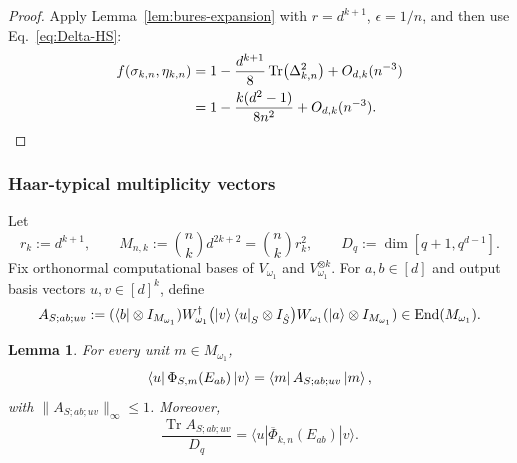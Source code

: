 \documentclass[10pt,twocolumn,superscriptaddress,aps,amsmath,amssymb,citeautoscript,floatfix,prx]{revtex4-2}
\theoremstyle{plain}
\theoremstyle{plain}
\theoremstyle{plain}
\theoremstyle{plain}
\theoremstyle{plain}
\theoremstyle{plain}
\newcommand{\End}{\mathrm{End}}
\theoremstyle{plain}
\newtheorem{smlemma}[smtheorem]{Lemma}
\theoremstyle{definition}
\theoremstyle{plain}
\begin{document}
\begin{appendix}
\begin{proof}
Apply Lemma~\ref{lem:bures-expansion} with $r=d^{k+1}$, $\epsilon=1/n$, and then use Eq.~\eqref{eq:Delta-HS}:
\begin{align*}
  f(\sigma_{k,n},\eta_{k,n})
  &=1-\frac{d^{k+1}}8\Tr(\Delta_{k,n}^2)
       +O_{d,k}(n^{-3})\\
  &=1-\frac{k(d^2-1)}{8n^2}+O_{d,k}(n^{-3}).
\end{align*}
\end{proof}

\subsubsection{Haar-typical multiplicity vectors}\label{subsubsec:supple_haar_typical}

Let
\[
  r_k:=d^{k+1},
  \qquad
  M_{n,k}:=\binom nk d^{2k+2}=\binom nk r_k^2, \qquad D_q:=\operatorname{dim}\left[q+1, q^{d-1}\right].
\]
Fix orthonormal computational bases of $V_{\omega_1}$ and $V_{\omega_1}^{\otimes k}$. 
For $a,b\in[d]$ and output basis vectors $u,v\in[d]^k$, define
\begin{equation}
\label{eq:test-operator}
  A_{S;ab;uv}
  :=(\bra b\otimes I_{M_{\omega_1}})
  W_{\omega_1}^\dagger\bigl(\ket v\bra u_S\otimes I_{\hat S}\bigr)W_{\omega_1}
  (\ket a\otimes I_{M_{\omega_1}})
  \in\End(M_{\omega_1}).
\end{equation}

\begin{smlemma}
\label{lem:quadratic-form}
For every unit $m\in M_{\omega_1}$,
\begin{equation}
\label{eq:entry-quadratic}
  \bra u\Phi_{S,m}(E_{ab})\ket v
  =\bra m A_{S;ab;uv}\ket m,
\end{equation}
with $\|A_{S;ab;uv}\|_\infty\le1$. Moreover,
\begin{equation}
    \frac{\operatorname{Tr} A_{S ; a b ; u v}}{D_q}=\langle u| \overline{\Phi}_{k,n}\left(E_{a b}\right)|v\rangle .
\end{equation}
\end{smlemma}


\end{appendix}
\end{document}

